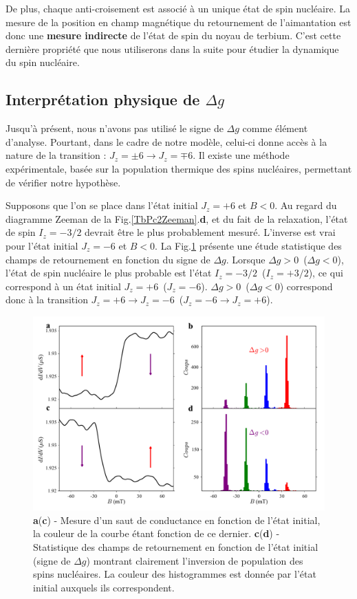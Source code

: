 De plus, chaque anti-croisement est associé à un unique état de spin nucléaire. La mesure de la position en champ magnétique du retournement de l'aimantation est donc une \textbf{mesure indirecte} de l'état de spin du noyau de terbium. C'est cette dernière propriété que nous utiliserons dans la suite pour étudier la dynamique du spin nucléaire.

\subsection{Interprétation physique de $\Delta g$}
Jusqu'à présent, nous n'avons pas utilisé le signe de $\Delta g$ comme élément d'analyse. Pourtant, dans le cadre de notre modèle, celui-ci donne accès à la nature de la transition : $J_z = \pm6 \rightarrow J_z = \mp 6$. Il existe une méthode expérimentale, basée sur la population thermique des spins nucléaires, permettant de vérifier notre hypothèse.

Supposons que l'on se place dans l'état initial $J_z=+6$ et $B<0$. Au regard du diagramme Zeeman de la Fig.\ref{TbPc2Zeeman}.\textbf{d}, et du fait de la relaxation, l'état de spin $I_z = -3/2$ devrait être le plus probablement mesuré. L'inverse est vrai pour l'état initial $J_z=-6$ et $B<0$. La Fig.\ref{analyse_signe_saut} présente une étude statistique des champs de retournement en fonction du signe de $\Delta g$. Lorsque $\Delta g> 0$~($\Delta g< 0$), l'état de spin nucléaire le plus probable est l'état $I_z = -3/2$~($I_z = +3/2$), ce qui correspond à un état initial $J_z=+6$~($J_z=-6$). $\Delta g> 0$~($\Delta g< 0$) correspond donc à la transition $J_z = +6 \rightarrow J_z =  - 6$~($J_z = -6 \rightarrow J_z =  + 6$).

\begin{figure}
\includegraphics[scale=0.45]{Resultats/JumpSens/JumpSens.pdf} 
\caption{\textbf{a}(\textbf{c}) - Mesure d'un saut de conductance en fonction de l'état initial, la couleur de la courbe étant fonction de ce dernier. \textbf{c}(\textbf{d}) - Statistique des champs de retournement en fonction de l'état initial (signe de $\Delta g$) montrant clairement l'inversion de population des spins nucléaires. La couleur des histogrammes est donnée par l'état initial auxquels ils correspondent.}
\label{analyse_signe_saut}
\end{figure}


